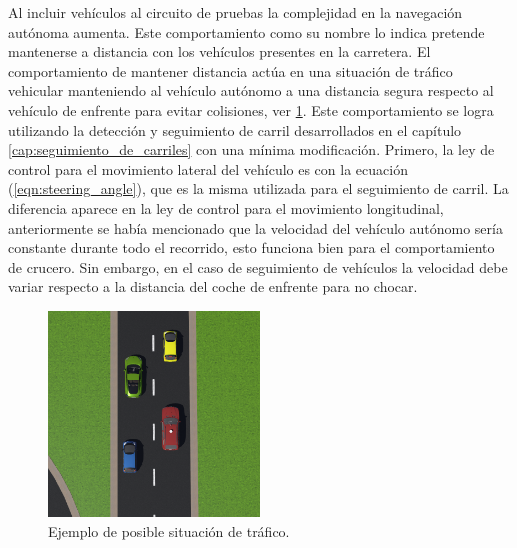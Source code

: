Al incluir vehículos al circuito de pruebas la complejidad en la navegación autónoma aumenta. Este comportamiento como su nombre lo indica pretende mantenerse a distancia con los vehículos presentes en la carretera. El comportamiento de mantener distancia actúa en una situación de tráfico vehicular manteniendo al vehículo autónomo a una distancia segura respecto al vehículo de enfrente para evitar colisiones, ver \ref{fig:keep_distance_behavior}.
Este comportamiento se logra utilizando la detección y seguimiento de carril desarrollados en el capítulo \ref{cap:seguimiento_de_carriles} con una mínima modificación. Primero, la ley de control para el movimiento lateral del vehículo es con la ecuación (\ref{eqn:steering_angle}), que es la misma utilizada para el seguimiento de carril. La diferencia aparece en la ley de control para el movimiento longitudinal, anteriormente se había mencionado que la velocidad del vehículo autónomo sería constante durante todo el recorrido, esto funciona bien para el comportamiento de crucero. Sin embargo, en el caso de seguimiento de vehículos la velocidad debe variar respecto a la distancia del coche de enfrente para no chocar. 
\begin{figure}[h]
    \centering
    \includegraphics[width=0.5\textwidth]{Figures/Figures_Cap06/keep_distance.png}
    \caption{Ejemplo de posible situación de tráfico.}
    \label{fig:keep_distance_behavior}
\end{figure}

